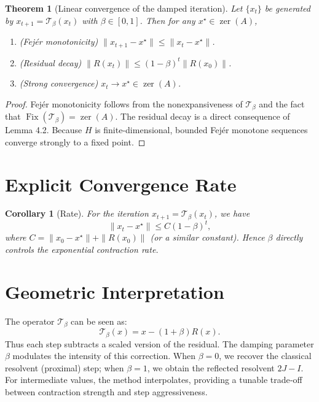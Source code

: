 \documentclass{article}
\newtheorem{theorem}{Theorem}
\newtheorem{corollary}{Corollary}
\begin{document}
\begin{theorem}[Linear convergence of the damped iteration]
Let $\{x_t\}$ be generated by $x_{t+1} = \mathcal{T}_\beta(x_t)$ with $\beta\in[0,1]$. Then for any $x^\star \in \operatorname{zer}(A)$,
\begin{enumerate}
\item (Fejér monotonicity) $\|x_{t+1}-x^\star\| \le \|x_t-x^\star\|$.
\item (Residual decay) $\|R(x_t)\| \le (1-\beta)^t \|R(x_0)\|$.
\item (Strong convergence) $x_t \to x^\star \in \operatorname{zer}(A)$.
\end{enumerate}
\end{theorem}
\begin{proof}
Fejér monotonicity follows from the nonexpansiveness of $\mathcal{T}_\beta$ and the fact that $\operatorname{Fix}(\mathcal{T}_\beta)=\operatorname{zer}(A)$. The residual decay is a direct consequence of Lemma 4.2. Because $H$ is finite-dimensional, bounded Fejér monotone sequences converge strongly to a fixed point.
\end{proof}

\section{Explicit Convergence Rate}

\begin{corollary}[Rate]
For the iteration $x_{t+1} = \mathcal{T}_\beta(x_t)$, we have
\[
\|x_t - x^\star\| \le C (1-\beta)^t,
\]
where $C = \|x_0 - x^\star\| + \|R(x_0)\|$ (or a similar constant). Hence $\beta$ directly controls the exponential contraction rate.
\end{corollary}

\section{Geometric Interpretation}

The operator $\mathcal{T}_\beta$ can be seen as:
\[
\mathcal{T}_\beta(x) = x - (1+\beta)R(x).
\]
Thus each step subtracts a scaled version of the residual. The damping parameter $\beta$ modulates the intensity of this correction. When $\beta=0$, we recover the classical resolvent (proximal) step; when $\beta=1$, we obtain the reflected resolvent $2J - I$. For intermediate values, the method interpolates, providing a tunable trade‑off between contraction strength and step aggressiveness.
\end{document}
